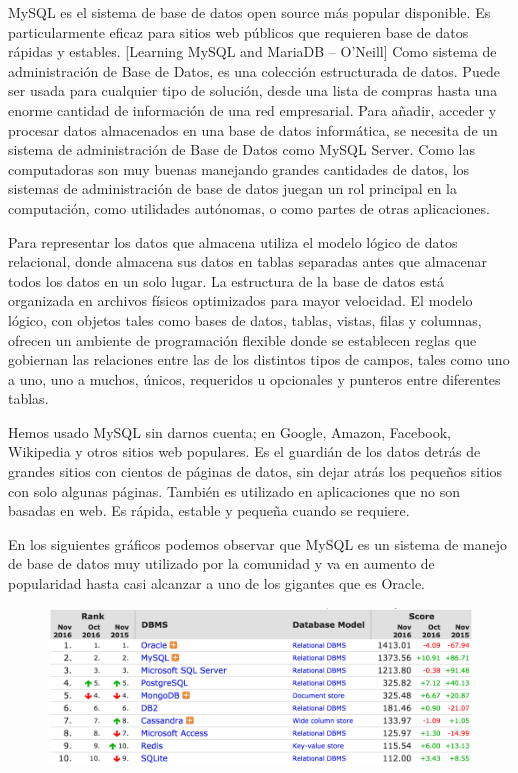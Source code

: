 MySQL es el sistema de base de datos open source más popular disponible. Es particularmente eficaz para sitios web públicos que requieren base de datos rápidas y estables. [Learning MySQL and MariaDB – O’Neill] Como sistema de administración de Base de Datos, es una colección estructurada de datos. Puede ser usada para cualquier tipo de solución, desde una lista de compras hasta una enorme cantidad de información de una red empresarial. Para añadir, acceder y procesar datos almacenados en una base de datos informática, se necesita de un sistema de administración de Base de Datos como MySQL Server. Como las computadoras son muy buenas manejando grandes cantidades de datos, los sistemas de administración de base de datos juegan un rol principal en la computación, como utilidades autónomas, o como partes de otras aplicaciones.

Para representar los datos que almacena utiliza el modelo lógico de datos relacional, donde almacena sus datos en tablas separadas antes que almacenar todos los datos en un solo lugar. La estructura de la base de datos está organizada en archivos físicos optimizados para mayor velocidad. El modelo lógico, con objetos tales como bases de datos, tablas, vistas, filas y columnas, ofrecen un ambiente de programación flexible donde se establecen reglas que gobiernan las relaciones entre las de los distintos tipos de campos, tales como uno a uno, uno a muchos, únicos, requeridos u opcionales y punteros entre diferentes tablas.

Hemos usado MySQL sin darnos cuenta; en Google, Amazon, Facebook, Wikipedia y otros sitios web populares. Es el guardián de los datos detrás de grandes sitios con cientos de páginas de datos, sin dejar atrás los pequeños sitios con solo algunas páginas. También es utilizado en aplicaciones que no son basadas en web. Es rápida, estable y pequeña cuando se requiere.

En los siguientes gráficos podemos observar que MySQL es un sistema de manejo de base de datos muy utilizado por la comunidad y va en aumento de popularidad hasta casi alcanzar a uno de los gigantes que es Oracle.

\begin{figure}[H]
\centering
\includegraphics[width=125mm,scale=1]{Figuras/tecnologias/rank_db_1}
  \label{graph_db_1}
\end{figure}

